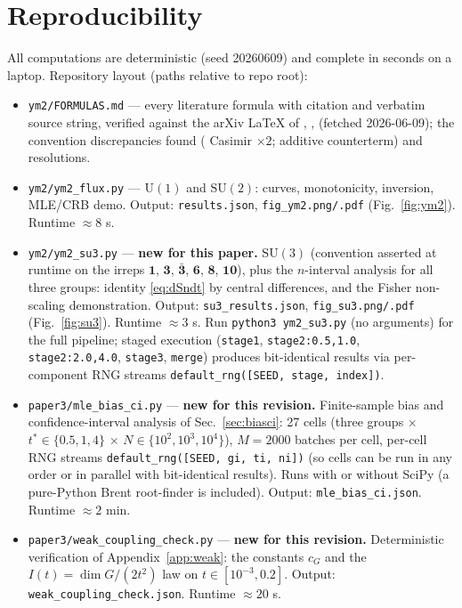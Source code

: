 \documentclass[11pt]{article}
\theoremstyle{remark}
\theoremstyle{plain}
\newcommand{\dG}{\dim G}
\begin{document}
\section{Reproducibility}\label{app:repro}

All computations are deterministic (seed 20260609) and complete in seconds on a laptop. Repository layout (paths relative to repo root):

\begin{itemize}
\item \texttt{ym2/FORMULAS.md} --- every literature formula with citation and verbatim source string, verified against the arXiv LaTeX of \cite{D14}, \cite{GS14}, \cite{D11} (fetched 2026-06-09); the convention discrepancies found (\cite{GS14} Casimir $\times 2$; additive counterterm) and resolutions.
\item \texttt{ym2/ym2\_flux.py} --- $\mathrm{U}(1)$ and $\mathrm{SU}(2)$: curves, monotonicity, inversion, MLE/CRB demo. Output: \texttt{results.json}, \texttt{fig\_ym2.png/.pdf} (Fig.~\ref{fig:ym2}). Runtime ${\approx}8$ s.
\item \texttt{ym2/ym2\_su3.py} --- \textbf{new for this paper.} $\mathrm{SU}(3)$ (convention asserted at runtime on the irreps $\mathbf{1}$, $\mathbf{3}$, $\bar{\mathbf{3}}$, $\mathbf{6}$, $\mathbf{8}$, $\mathbf{10}$), plus the $n$-interval analysis for all three groups: identity \eqref{eq:dSndt} by central differences, and the Fisher non-scaling demonstration. Output: \texttt{su3\_results.json}, \texttt{fig\_su3.png/.pdf} (Fig.~\ref{fig:su3}). Runtime ${\approx}3$ s. Run \texttt{python3 ym2\_su3.py} (no arguments) for the full pipeline; staged execution (\texttt{stage1}, \texttt{stage2:0.5,1.0}, \texttt{stage2:2.0,4.0}, \texttt{stage3}, \texttt{merge}) produces bit-identical results via per-component RNG streams \texttt{default\_rng([SEED, stage, index])}.
\item \texttt{paper3/mle\_bias\_ci.py} --- \textbf{new for this revision.} Finite-sample bias and confidence-interval analysis of Sec.~\ref{sec:biasci}: 27 cells (three groups $\times$ $t^* \in \{0.5,1,4\}$ $\times$ $N \in \{10^2,10^3,10^4\}$), $M = 2000$ batches per cell, per-cell RNG streams \texttt{default\_rng([SEED, gi, ti, ni])} (so cells can be run in any order or in parallel with bit-identical results). Runs with or without SciPy (a pure-Python Brent root-finder is included). Output: \texttt{mle\_bias\_ci.json}. Runtime ${\approx}2$ min.
\item \texttt{paper3/weak\_coupling\_check.py} --- \textbf{new for this revision.} Deterministic verification of Appendix~\ref{app:weak}: the constants $c_G$ and the $I(t) = \dG/(2t^2)$ law on $t \in [10^{-3}, 0.2]$. Output: \texttt{weak\_coupling\_check.json}. Runtime ${\approx}20$ s.

\end{itemize}
\end{document}
